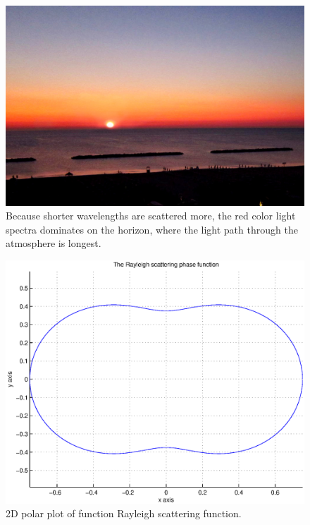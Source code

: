 \label{lab:HEN}
\begin{minipage}{\linewidth}
      \begin{minipage}{0.45\linewidth}
          \begin{figure}[H]
              \includegraphics[width=\linewidth]{images/sunsetbeach.jpg}
              \captionsetup{width=\linewidth}
              \caption[Sunset atmospherical behavior.]{Because shorter wavelengths are scattered more, the red color light spectra dominates on the horizon, where the light path through the atmosphere is longest.}\label{fig:REYLIGHSUNSET}
          \end{figure}
      \end{minipage}
      \hspace{0.05\linewidth}
      \begin{minipage}{0.45\linewidth}
          \begin{figure}[H]
              \includegraphics[width=\linewidth]{images/reyleigh2dgraph}
              \captionsetup{width=\linewidth}
              \caption[2D polar plot of Rayleigh scattering function.]{2D polar plot of  function Rayleigh scattering function.}\label{fig:REYLIGH}
          \end{figure}
      \end{minipage}
  \end{minipage}


